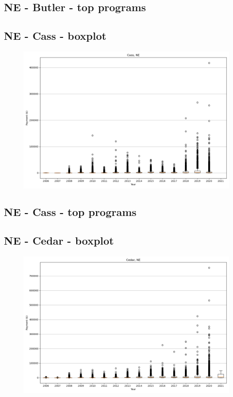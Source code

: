 \subsection*{NE - Butler - top programs}

\newpage
\subsection*{NE - Cass - boxplot}
\begin{figure}[h]
\centering
\includegraphics[width=7in]{../output/boxplots/counties/Cass-NE_boxplot.png}
\end{figure}


\subsection*{NE - Cass - top programs}

\newpage
\subsection*{NE - Cedar - boxplot}
\begin{figure}[h]
\centering
\includegraphics[width=7in]{../output/boxplots/counties/Cedar-NE_boxplot.png}
\end{figure}


